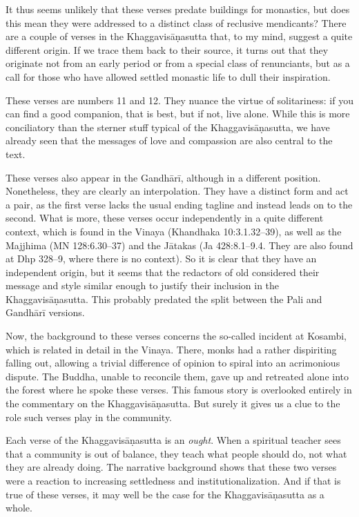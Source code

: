 \documentclass[12pt,openany]{book}%
\begin{document}
It thus seems unlikely that these verses predate buildings for monastics, but does this mean they were addressed to a distinct class of reclusive mendicants? There are a couple of verses in the \textsanskrit{Khaggavisāṇasutta} that, to my mind, suggest a quite different origin. If we trace them back to their source, it turns out that they originate not from an early period or from a special class of renunciants, but as a call for those who have allowed settled monastic life to dull their inspiration.

These verses are numbers 11 and 12. They nuance the virtue of solitariness: if you can find a good companion, that is best, but if not, live alone. While this is more conciliatory than the sterner stuff typical of the \textsanskrit{Khaggavisāṇasutta}, we have already seen that the messages of love and compassion are also central to the text.

These verses also appear in the \textsanskrit{Gandhārī}, although in a different position. Nonetheless, they are clearly an interpolation. They have a distinct form and act a pair, as the first verse lacks the usual ending tagline and instead leads on to the second. What is more, these verses occur independently in a quite different context, which is found in the Vinaya (Khandhaka 10:3.1.32–39), as well as the Majjhima (MN 128:6.30–37) and the \textsanskrit{Jātakas} (Ja 428:8.1–9.4. They are also found at Dhp 328–9, where there is no context). So it is clear that they have an independent origin, but it seems that the redactors of old considered their message and style similar enough to justify their inclusion in the \textsanskrit{Khaggavisāṇasutta}. This probably predated the split between the Pali and \textsanskrit{Gandhārī} versions.

Now, the background to these verses concerns the so-called incident at Kosambi, which is related in detail in the Vinaya. There, monks had a rather dispiriting falling out, allowing a trivial difference of opinion to spiral into an acrimonious dispute. The Buddha, unable to reconcile them, gave up and retreated alone into the forest where he spoke these verses. This famous story is overlooked entirely in the commentary on the \textsanskrit{Khaggavisāṇasutta}. But surely it gives us a clue to the role such verses play in the community.

Each verse of the \textsanskrit{Khaggavisāṇasutta} is an \emph{ought}. When a spiritual teacher sees that a community is out of balance, they teach what people should do, not what they are already doing. The narrative background shows that these two verses were a reaction to increasing settledness and institutionalization. And if that is true of these verses, it may well be the case for the \textsanskrit{Khaggavisāṇasutta} as a whole.
\end{document}
